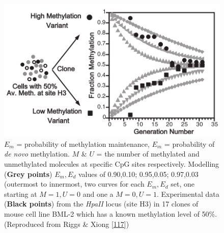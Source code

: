 \documentclass[
]{book}
\begin{document}
\begin{figure}

{\centering \includegraphics[width=0.7\linewidth]{figs/Riggs2004PNASfig2DNAmFidelity} 

}

\caption{\(E_m\) = probability of methylation maintenance, \(E_m\) = probability of \emph{de novo} methylation. \(M\) \& \(U\) = the number of methylated and unmethylated molecules at specific CpG sites respectively. Modelling (\textbf{Grey points}) \(E_m,E_d\) values of 0.90,0.10; 0.95,0.05; 0.97,0.03 (outermost to innermost, two curves for each \(E_m,E_d\) set, one starting at \(M=1,U=0\) and one a \(M=0,U=1\). Experimental data (\textbf{Black points}) from the \emph{HpaII} locus (site H3) in 17 clones of mouse cell line BML-2 which has a known methylation level of 50\%. (Reproduced from Riggs \& Xiong {[}\protect\hyperlink{ref-Riggs2004a}{117}{]})}\label{fig:Riggs2004PNASfig2DNAmFidelity}
\end{figure}
\end{document}
